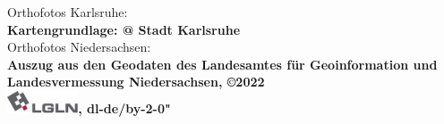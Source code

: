 \pagebreak
\hspace{0pt}
\vfill
\begin{center}
	Orthofotos Karlsruhe:\\\textbf{Kartengrundlage: @ Stadt Karlsruhe} \\
    \vspace*{2cm}
    Orthofotos Niedersachsen:\\
    \textbf{Auszug aus den Geodaten des Landesamtes für Geoinformation und Landesvermessung Niedersachsen, ©2022} \\
    \includegraphics[height=0.65cm]{Bilder/Logos/lgln.png}\textbf{, dl-de/by-2-0"}
\end{center}
\vfill
\hspace{0pt}
\pagebreak